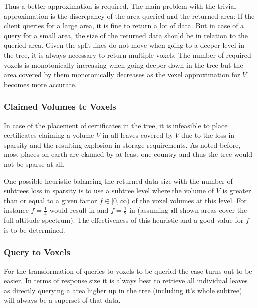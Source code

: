 \documentclass[10pt,conference,compsocconf]{IEEEtran}
\begin{document}
Thus a better approximation is required.
The main problem with the trivial approximation is the discrepancy of the area queried and the returned area:
If the client queries for a large area, it is fine to return a lot of data.
But in case of a query for a small area, the size of the returned data should be in relation to the queried area.
Given the split lines do not move when going to a deeper level in the tree, it is always necessary to return multiple voxels.
The number of required voxels is monotonically increasing when going deeper down in the tree but the area covered by them monotonically decreases as the voxel approximation for $V$ becomes more accurate.

\subsubsection{Claimed Volumes to Voxels}

In case of the placement of certificates in the tree, it is infeasible to place certificates claiming a volume $V$ in all leaves covered by $V$ due to the loss in sparsity and the resulting explosion in storage requirements.
As noted before, most places on earth are claimed by at least one country and thus the tree would not be sparse at all.

One possible heuristic balancing the returned data size with the number of subtrees loss in sparsity is to use a subtree level where the volume of $V$ is greater than or equal to a given factor $f \in [0, \infty)$ of the voxel volumes at this level.
For instance $f = \frac{1}{4}$ would result in  and $f = \frac{1}{2}$ in  (assuming all shown areas cover the full altitude spectrum).
The effectiveness of this heuristic and a good value for $f$ is to be determined.

\subsubsection{Query to Voxels}

For the transformation of queries to voxels to be queried the case turns out to be easier.
In terms of response size it is always best to retrieve all individual leaves as directly querying a area higher up in the tree (including it's whole subtree) will always be a superset of that data.
\end{document}
